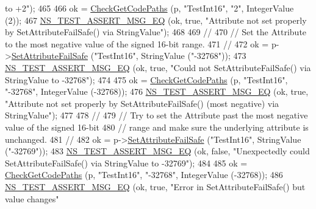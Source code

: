 \begin{DoxyCode}
{       to +2"});
465 
466   ok = \hyperlink{classAttributeTestCase_a902fb84c803f1c898329f9263575331e}{CheckGetCodePaths} (p, \textcolor{stringliteral}{"TestInt16"}, \textcolor{stringliteral}{"2"}, IntegerValue (2));
467   \hyperlink{group__testing_ga2a9d78cffb3db8e867c35fff0b698cf5}{NS\_TEST\_ASSERT\_MSG\_EQ} (ok, \textcolor{keyword}{true}, \textcolor{stringliteral}{"Attribute not set properly by
       SetAttributeFailSafe() via StringValue"});
468 
469   \textcolor{comment}{//}
470   \textcolor{comment}{// Set the Attribute to the most negative value of the signed 16-bit range.}
471   \textcolor{comment}{//}
472   ok = p->\hyperlink{classns3_1_1ObjectBase_aa7d333004e970f925a4ed5df275541b5}{SetAttributeFailSafe} (\textcolor{stringliteral}{"TestInt16"}, StringValue (\textcolor{stringliteral}{"-32768"}));
473   \hyperlink{group__testing_ga2a9d78cffb3db8e867c35fff0b698cf5}{NS\_TEST\_ASSERT\_MSG\_EQ} (ok, \textcolor{keyword}{true}, \textcolor{stringliteral}{"Could not SetAttributeFailSafe() via StringValue
       to -32768"});
474 
475   ok = \hyperlink{classAttributeTestCase_a902fb84c803f1c898329f9263575331e}{CheckGetCodePaths} (p, \textcolor{stringliteral}{"TestInt16"}, \textcolor{stringliteral}{"-32768"}, IntegerValue (-32768));
476   \hyperlink{group__testing_ga2a9d78cffb3db8e867c35fff0b698cf5}{NS\_TEST\_ASSERT\_MSG\_EQ} (ok, \textcolor{keyword}{true}, \textcolor{stringliteral}{"Attribute not set properly by
       SetAttributeFailSafe() (most negative) via StringValue"});
477 
478   \textcolor{comment}{//}
479   \textcolor{comment}{// Try to set the Attribute past the most negative value of the signed 16-bit}
480   \textcolor{comment}{// range and make sure the underlying attribute is unchanged.}
481   \textcolor{comment}{//}
482   ok = p->\hyperlink{classns3_1_1ObjectBase_aa7d333004e970f925a4ed5df275541b5}{SetAttributeFailSafe} (\textcolor{stringliteral}{"TestInt16"}, StringValue (\textcolor{stringliteral}{"-32769"}));
483   \hyperlink{group__testing_ga2a9d78cffb3db8e867c35fff0b698cf5}{NS\_TEST\_ASSERT\_MSG\_EQ} (ok, \textcolor{keyword}{false}, \textcolor{stringliteral}{"Unexpectedly could SetAttributeFailSafe() via
       StringValue to -32769"});
484 
485   ok = \hyperlink{classAttributeTestCase_a902fb84c803f1c898329f9263575331e}{CheckGetCodePaths} (p, \textcolor{stringliteral}{"TestInt16"}, \textcolor{stringliteral}{"-32768"}, IntegerValue (-32768));
486   \hyperlink{group__testing_ga2a9d78cffb3db8e867c35fff0b698cf5}{NS\_TEST\_ASSERT\_MSG\_EQ} (ok, \textcolor{keyword}{true}, \textcolor{stringliteral}{"Error in SetAttributeFailSafe() but value changes"}

\end{DoxyCode}
